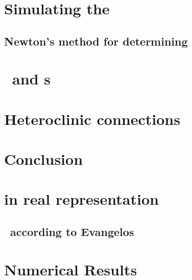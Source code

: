 \documentclass[hyperref]{inputs/gatech-thesis}
\begin{document}
\chapter{Simulating the \KSe}
\label{chap:Numerics}
    \section{Newton's method for determining \reqva}
        


\chapter{\Eqva\ and \po s}

\chapter{Heteroclinic connections}

\chapter{Conclusion}



\appendix

\chapter{\KSe in real representation}

\section{\KSe\ according to Evangelos}


\chapter{Numerical Results}

         \PublicPrivate{
         }{ %
%  
         } %
\begin{postliminary}
{}
\begin{vita}
    
\end{vita}
\end{postliminary}
\end{document}

